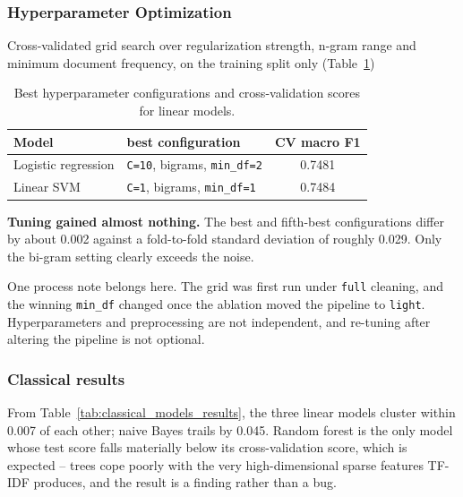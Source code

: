 \subsubsection{Hyperparameter Optimization}

Cross-validated grid search over regularization strength, n-gram range and minimum document frequency, on the training split only (Table~\ref{tab:hyperparameter_tuning})

\begin{table}[H]
\centering
\caption{Best hyperparameter configurations and cross-validation scores for linear models.}
\label{tab:hyperparameter_tuning}
\vspace{0.5em}
\begin{tabular}{l l c}
\hline
Model & best configuration & CV macro F1 \\
\hline
Logistic regression & \texttt{C=10}, bigrams, \texttt{min\_df=2} & 0.7481 \\
Linear SVM & \texttt{C=1}, bigrams, \texttt{min\_df=1} & 0.7484 \\
\hline
\end{tabular}
\end{table}

\textbf{Tuning gained almost nothing.} The best and fifth-best configurations differ by about 0.002 against a fold-to-fold standard deviation of roughly 0.029. Only the bi-gram setting clearly exceeds the noise.

One process note belongs here. The grid was first run under \texttt{full} cleaning, and the winning \texttt{min\_df} changed once the ablation moved the pipeline to \texttt{light}. Hyperparameters and preprocessing are not independent, and re-tuning after altering the pipeline is not optional.

\subsubsection{Classical results}

From Table~\ref{tab:classical_models_results}, the three linear models cluster within 0.007 of each other; naive Bayes trails by 0.045. Random forest is the only model whose test score falls materially below its cross-validation score, which is expected -- trees cope poorly with the very high-dimensional sparse features TF-IDF produces, and the result is a finding rather than a bug.

